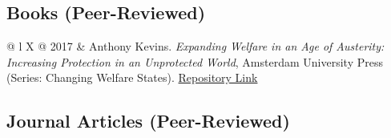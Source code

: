 \documentclass[letterpaper,fontsize=10.5pt]{scrartcl}
\begin{document}
\subsection{Books (Peer-Reviewed)}
\vspace{-2em}
\begin{longtblr}[entry=none,label=none]{@{} l X @{} }
	2017 & Anthony Kevins. \textit{Expanding Welfare in an Age of Austerity: Increasing Protection in an Unprotected World}, Amsterdam University Press (Series: Changing Welfare States). \href{https://repository.lboro.ac.uk/articles/book/Expanding_welfare_in_an_age_of_austerity_Increasing_protection_in_an_unprotected_world/9994709}{Repository Link}           
\end{longtblr}

\vspace{-2em}
\subsection{Journal Articles (Peer-Reviewed)}
\vspace{-2em}
\end{document}
